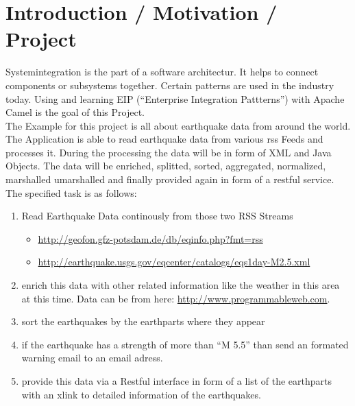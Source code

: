 \documentclass[11pt,english,ngerman, headsepline]{scrreprt}
\begin{document}


%
\tableofcontents{}

\pagestyle{scrheadings}    %



\chapter{Introduction / Motivation / Project}
 
 Systemintegration is the part of a software architectur. It helps to connect
 components or subsystems together. Certain patterns are used in the industry
 today. Using and learning EIP (``Enterprise Integration Pattterns'') with
 Apache Camel is the goal of this Project.\\
 
 The Example for this project is all about earthquake data from around the
 world. The Application is able to read earthquake data from various rss Feeds
 and processes it. During the processing the data will be in form of XML and
 Java Objects. The data will be enriched, splitted, sorted, aggregated,
 normalized, marshalled umarshalled and finally provided again in form of a
 restful service.\\
 
 The specified task is as follows:
 
 \begin{enumerate}
   
 
 \item Read Earthquake Data continously from those two RSS Streams
 \begin{itemize}
  	\item \url{http://geofon.gfz-potsdam.de/db/eqinfo.php?fmt=rss}
  	\item \url{http://earthquake.usgs.gov/eqcenter/catalogs/eqs1day-M2.5.xml}
  \end{itemize}
  \item enrich this data with other related information like the weather in this
  area at this time. Data can be from here: \url{http://www.programmableweb.com}.
  \item sort the earthquakes by the earthparts where they appear
  \item if the earthquake has a strength of more than ``M 5.5'' than send an
  formated warning email to an email adress.
  \item  provide this data via a Restful interface in form of a list of the
  earthparts with an xlink to detailed information of the earthquakes.
  
 \end{enumerate}
\end{document}
